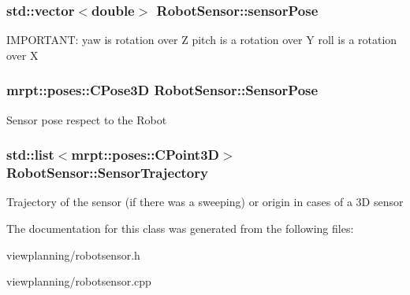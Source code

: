 \subsubsection[{\texorpdfstring{sensor\+Pose}{sensorPose}}]{\setlength{\rightskip}{0pt plus 5cm}std\+::vector$<$double$>$ Robot\+Sensor\+::sensor\+Pose\hspace{0.3cm}{\ttfamily [protected]}}\hypertarget{classRobotSensor_a7e9d4be5f206d56109fc2e3c34e2aac2}{}\label{classRobotSensor_a7e9d4be5f206d56109fc2e3c34e2aac2}
I\+M\+P\+O\+R\+T\+A\+NT\+: yaw is rotation over Z pitch is a rotation over Y roll is a rotation over X 
\subsubsection[{\texorpdfstring{Sensor\+Pose}{SensorPose}}]{\setlength{\rightskip}{0pt plus 5cm}mrpt\+::poses\+::\+C\+Pose3D Robot\+Sensor\+::\+Sensor\+Pose\hspace{0.3cm}{\ttfamily [protected]}}\hypertarget{classRobotSensor_a88bbdab74a1836ca367bcb344c4ca241}{}\label{classRobotSensor_a88bbdab74a1836ca367bcb344c4ca241}
Sensor pose respect to the Robot 
\subsubsection[{\texorpdfstring{Sensor\+Trajectory}{SensorTrajectory}}]{\setlength{\rightskip}{0pt plus 5cm}std\+::list$<$mrpt\+::poses\+::\+C\+Point3D$>$ Robot\+Sensor\+::\+Sensor\+Trajectory\hspace{0.3cm}{\ttfamily [protected]}}\hypertarget{classRobotSensor_a47898d707a343c7530018493c87f3320}{}\label{classRobotSensor_a47898d707a343c7530018493c87f3320}
Trajectory of the sensor (if there was a sweeping) or origin in cases of a 3D sensor 

The documentation for this class was generated from the following files\+:\begin{DoxyCompactItemize}
\item 
viewplanning/robotsensor.\+h\item 
viewplanning/robotsensor.\+cpp\end{DoxyCompactItemize}
